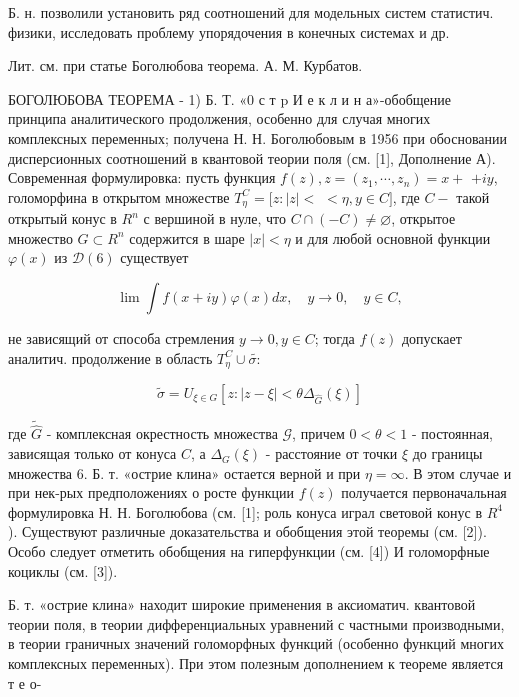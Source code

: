 \documentclass[10pt]{article}
\begin{document}
Б. н. позволили установить ряд соотношений для модельных систем статистич. физики, исследовать проблему упорядочения в конечных системах и др.



Лит. см. при статье Боголюбова теорема. А. М. Курбатов.



БОГОЛЮБОВА ТЕОРЕМА - 1) Б. Т. «0 с т p И е к л и н а»-обобщение принципа аналитического продолжения, особенно для случая многих комплексных переменных; получена Н. Н. Боголюбовым в 1956 при обосновании дисперсионных соотношений в квантовой теории поля (см. [1], Дополнение А). Современная формулировка: пусть функция $f(z), z=\left(z_{1}, \cdots, z_{n}\right)=x+$ $+i y$, голоморфина в открытом множестве $T_{\eta}^{C}=[z:|z|<$ $<\eta, y \in C]$, где $C-$ такой открытый конус в $R^{n}$ с вершиной в нуле, что $C \cap(-C) \neq \varnothing$, открытое множество $G \subset R^{n}$ содержится в шаре $|x|<\eta$ и для любой основной функции $\varphi(x)$ из $\mathscr{D}(6)$ существует



\[

\lim \int f(x+i y) \varphi(x) d x, \quad y \longrightarrow 0, \quad y \in C,

\]



не зависящий от способа стремления $y \rightarrow 0, y \in C$; тогда $f(z)$ допускает аналитич. продолжение в область $T_{\eta}^{C} \cup \widetilde{\sigma:}$



\[

\tilde{\sigma}=U_{\xi \in G}\left[z:|z-\xi|<\theta \Delta_{\widehat{G}}(\xi)\right]

\]



где $\widetilde{\widehat{G}}$ - комплексная окрестность множества $\mathcal{G}$, причем $0<\theta<1$ - постоянная, зависящая только от конуса $C$, а $\Delta_{G}(\xi)$ - расстояние от точки $\xi$ до границы множества 6. Б. т. «острие клина» остается верной и при $\eta=\infty$. В этом случае и при нек-рых предположениях о росте функции $f(z)$ получается первоначальная формулировка Н. Н. Боголюбова (см. [1]; роль конуса играл световой конус в $R^{4}$ ). Существуют различные доказательства и обобщения этой теоремы (см. [2]). Особо следует отметить обобщения на гиперфункции (см. [4]) И голоморфные коциклы (см. [3]).



Б. т. «острие клина» находит широкие применения в аксиоматич. квантовой теории поля, в теории дифференциальных уравнений с частными производными, в теории граничных значений голоморфных функций (особенно функций многих комплексных переменных). При этом полезным дополнением к теореме является т е о-
\end{document}
